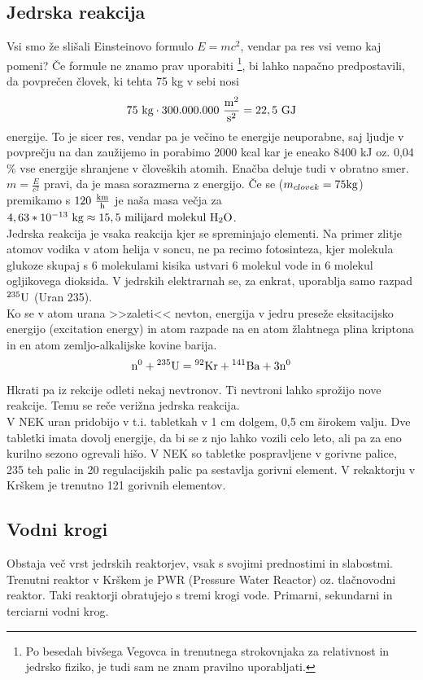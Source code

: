 \documentclass[a4paper,12pt]{article}
\begin{document}
\subsection{Jedrska reakcija}
Vsi smo že slišali Einsteinovo formulo $E = mc^2$, vendar pa res vsi vemo kaj pomeni? Če formule ne znamo prav uporabiti \footnote{Po besedah bivšega Vegovca in trenutnega strokovnjaka za relativnost in jedrsko fiziko, je tudi sam ne znam pravilno uporabljati.}, bi lahko napačno predpostavili, da povprečen človek, ki tehta 75 kg v sebi nosi $$75 \textnormal{ kg} \cdot 300.000.000 \textnormal{ } \frac{\textnormal{m}^2}{\textnormal{s}^2} = 22,5 \textnormal{ GJ}$$ energije. To je sicer res, vendar pa je večino te energije neuporabne, saj ljudje v povprečju na dan zaužijemo in porabimo 2000 kcal kar je eneako 8400 kJ oz. 0,04 \% vse energije shranjene v človeških atomih.
Enačba deluje tudi v obratno smer. $m = \frac{E}{c^2}$ pravi, da je masa sorazmerna z energijo. Če se ($m_{clovek} = 75 \textnormal{kg}$) premikamo s $120 \textnormal{ } \frac{\textnormal{km}}{\textnormal{h}}$ je naša masa večja za $4,63 * 10^{-13} \textnormal{ kg} \approx 15,5 \textnormal{ milijard molekul } \textnormal{H}_2\textnormal{O}$.\\
Jedrska reakcija je vsaka reakcija kjer se spreminjajo elementi. Na primer zlitje atomov vodika v atom helija v soncu, ne pa recimo fotosinteza, kjer molekula glukoze skupaj s 6 molekulami kisika ustvari 6 molekul vode in 6 molekul ogljikovega dioksida.
V jedrskih elektrarnah se, za enkrat, uporablja samo razpad ${}^{235}\textnormal{U}$ (Uran 235).\\
Ko se v atom urana >>zaleti<< nevton, energija v jedru preseže eksitacijsko energijo (excitation energy) in atom razpade na en atom žlahtnega plina kriptona in en atom zemljo-alkalijske kovine barija. $$ \textnormal{n}^0 + {}^{235}\textnormal{U} = {}^{92}\textnormal{Kr} + {}^{141}\textnormal{Ba} + 3\textnormal{n}^0 $$ Hkrati pa iz rekcije odleti nekaj nevtronov. Ti nevtroni lahko sprožijo nove reakcije. Temu se reče verižna jedrska reakcija.\\
V NEK uran pridobijo v t.i. tabletkah v 1 cm dolgem, 0,5 cm širokem valju. Dve tabletki imata dovolj energije, da bi se z njo lahko vozili celo leto, ali pa za eno kurilno sezono ogrevali hišo. V NEK so tabletke pospravljene v gorivne palice, 235 teh palic in 20 regulacijskih palic pa sestavlja gorivni element. V rekaktorju v Krškem je trenutno 121 gorivnih elementov.\\
\subsection{Vodni krogi}
Obstaja več vrst jedrskih reaktorjev, vsak s svojimi prednostimi in slabostmi. Trenutni reaktor v Krškem je PWR (Pressure Water Reactor) oz. tlačnovodni reaktor. Taki reaktorji obratujejo s tremi krogi vode. Primarni, sekundarni in terciarni vodni krog.
\end{document}
